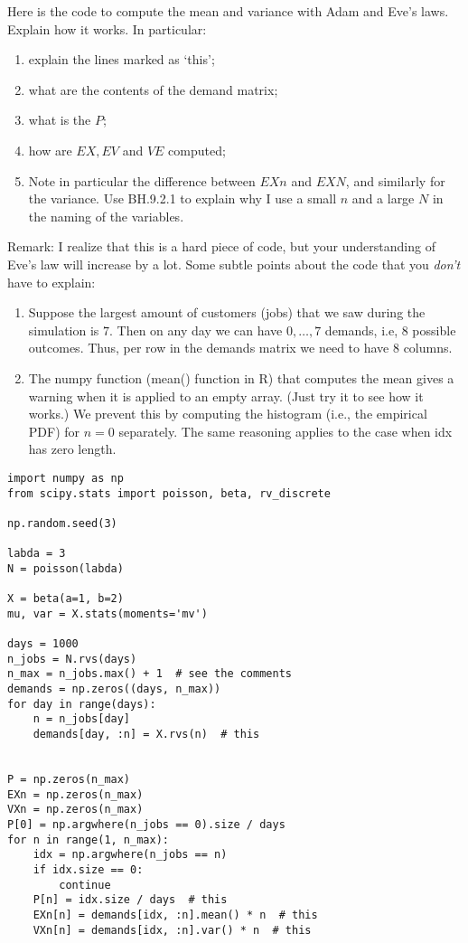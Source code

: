 \begin{exercise}
Here is the code to compute the mean and variance with Adam and Eve's laws. Explain how it works. In particular:
\begin{enumerate}
\item explain the lines marked as `this';
\item what are the contents of the demand matrix;
\item what is the $P$;
\item how are $EX, EV$ and $VE$  computed;
\item Note in particular the difference between $EXn$ and $EXN$, and similarly for the variance. Use BH.9.2.1 to explain why I use a small $n$ and a large $N$ in the naming of the variables.
\end{enumerate}

Remark: I realize that this is a hard piece of code, but your understanding of Eve's law will increase by a lot. Some subtle points about the code that you \emph{don't} have to explain:
\begin{enumerate}
\item Suppose the largest amount of customers (jobs) that we saw during the simulation is $7$. Then on any day we can have $0, \ldots, 7$ demands, i.e, 8 possible outcomes. Thus, per row in the demands matrix we need to have 8 columns.
\item The numpy function (mean() function in R) that computes the mean gives a warning when it is applied to an empty array. (Just try it to see how it works.) We prevent this by computing the histogram (i.e., the empirical PDF) for $n=0$ separately. The same reasoning applies to the case when idx has zero length.
\end{enumerate}


\begin{verbatim}
import numpy as np
from scipy.stats import poisson, beta, rv_discrete

np.random.seed(3)

labda = 3
N = poisson(labda)

X = beta(a=1, b=2)
mu, var = X.stats(moments='mv')

days = 1000
n_jobs = N.rvs(days)
n_max = n_jobs.max() + 1  # see the comments
demands = np.zeros((days, n_max))
for day in range(days):
    n = n_jobs[day]
    demands[day, :n] = X.rvs(n)  # this


P = np.zeros(n_max)
EXn = np.zeros(n_max)
VXn = np.zeros(n_max)
P[0] = np.argwhere(n_jobs == 0).size / days
for n in range(1, n_max):
    idx = np.argwhere(n_jobs == n)
    if idx.size == 0:
        continue
    P[n] = idx.size / days  # this
    EXn[n] = demands[idx, :n].mean() * n  # this
    VXn[n] = demands[idx, :n].var() * n  # this


\end{verbatim}
\end{exercise}
